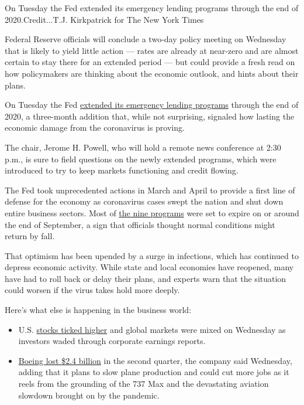 On Tuesday the Fed extended its emergency lending programs through the
end of 2020.Credit...T.J. Kirkpatrick for The New York Times

Federal Reserve officials will conclude a two-day policy meeting on
Wednesday that is likely to yield little action --- rates are already at
near-zero and are almost certain to stay there for an extended period
--- but could provide a fresh read on how policymakers are thinking
about the economic outlook, and hints about their plans.

On Tuesday the Fed
\href{https://www.nytimes3xbfgragh.onion/2020/07/28/business/economy/coronavirus-federal-reserve-policy.html}{extended
its emergency lending programs} through the end of 2020, a three-month
addition that, while not surprising, signaled how lasting the economic
damage from the coronavirus is proving.

The chair, Jerome H. Powell, who will hold a remote news conference at
2:30 p.m., is sure to field questions on the newly extended programs,
which were introduced to try to keep markets functioning and credit
flowing.

The Fed took unprecedented actions in March and April to provide a first
line of defense for the economy as coronavirus cases swept the nation
and shut down entire business sectors. Most of
\href{https://www.nytimes3xbfgragh.onion/2020/03/23/business/economy/coronavirus-fed-bond-buying.html}{the
nine programs} were set to expire on or around the end of September, a
sign that officials thought normal conditions might return by fall.

That optimism has been upended by a surge in infections, which has
continued to depress economic activity. While state and local economies
have reopened, many have had to roll back or delay their plans, and
experts warn that the situation could worsen if the virus takes hold
more deeply.

Here's what else is happening in the business world:

\begin{itemize}
\item
  U.S.
  \href{https://www.nytimes3xbfgragh.onion/live/2020/07/29/business/stock-market-today-coronavirus}{stocks
  ticked higher} and global markets were mixed on Wednesday as investors
  waded through corporate earnings reports.
\item
  \href{https://www.nytimes3xbfgragh.onion/live/2020/07/29/business/stock-market-today-coronavirus}{Boeing
  lost \$2.4 billion} in the second quarter, the company said Wednesday,
  adding that it plans to slow plane production and could cut more jobs
  as it reels from the grounding of the 737 Max and the devastating
  aviation slowdown brought on by the pandemic.
\end{itemize}

